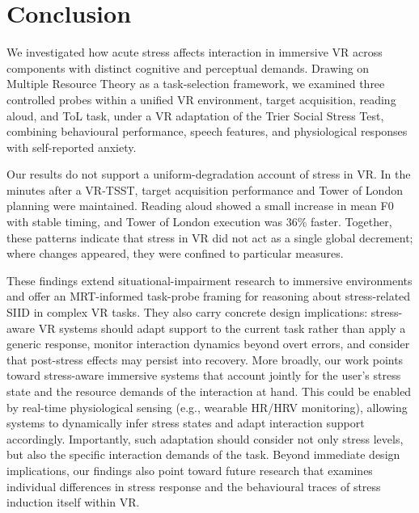 \section{Conclusion}
We investigated how acute stress affects interaction in immersive VR across components with distinct cognitive and perceptual demands. Drawing on Multiple Resource Theory as a task-selection framework, we examined three controlled probes within a unified VR environment, target acquisition, reading aloud, and ToL task, under a VR adaptation of the Trier Social Stress Test, combining behavioural performance, speech features, and physiological responses with self-reported anxiety.

Our results do not support a uniform-degradation account of stress in VR. In the minutes after a VR-TSST, target acquisition performance and Tower of London planning were maintained. Reading aloud showed a small increase in mean F0 with stable timing, and Tower of London execution was 36\% faster. Together, these patterns indicate that stress in VR did not act as a single global decrement; where changes appeared, they were confined to particular measures.

These findings extend situational-impairment research to immersive environments and offer an MRT-informed task-probe framing for reasoning about stress-related SIID in complex VR tasks. They also carry concrete design implications: stress-aware VR systems should adapt support to the current task rather than apply a generic response, monitor interaction dynamics beyond overt errors, and consider that post-stress effects may persist into recovery. More broadly, our work points toward stress-aware immersive systems that account jointly for the user's stress state and the resource demands of the interaction at hand. This could be enabled by real-time physiological sensing (e.g., wearable HR/HRV monitoring), allowing systems to dynamically infer stress states and adapt interaction support accordingly. Importantly, such adaptation should consider not only stress levels, but also the specific interaction demands of the task. Beyond immediate design implications, our findings also point toward future research that examines individual differences in stress response and the behavioural traces of stress induction itself within VR.